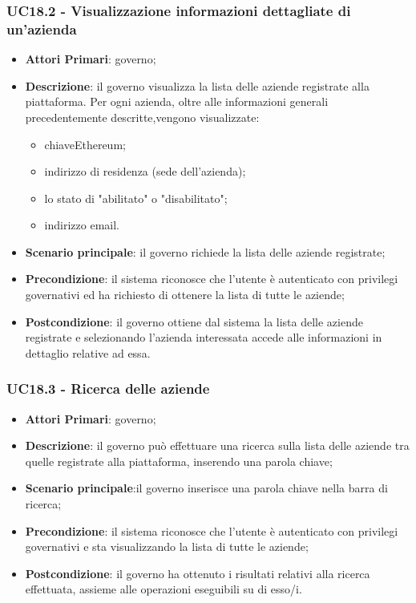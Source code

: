 \subsubsection{UC18.2 - Visualizzazione informazioni dettagliate di un'azienda}

\begin{itemize}
	\item \textbf{Attori Primari}: governo;
	\item \textbf{Descrizione}: il governo visualizza la lista delle aziende registrate alla piattaforma. Per ogni azienda, oltre alle informazioni generali precedentemente descritte,vengono visualizzate:
	\begin{itemize}
		\item chiave\glosp Ethereum\glo;
		\item indirizzo di residenza (sede dell'azienda);
		\item lo stato di "abilitato" o "disabilitato";
		\item indirizzo email.
	\end{itemize}
	
	\item \textbf{Scenario principale}: il governo richiede la lista delle aziende registrate;
	\item \textbf{Precondizione}: il sistema riconosce che l'utente è autenticato con privilegi governativi ed ha richiesto di ottenere la lista di tutte le aziende;
	\item \textbf{Postcondizione}: il governo ottiene dal sistema la lista delle aziende registrate e selezionando l'azienda interessata accede alle informazioni in dettaglio relative ad essa.
\end{itemize}

\subsubsection{UC18.3 - Ricerca delle aziende}
\begin{itemize}
	\item \textbf{Attori Primari}: governo;
	\item \textbf{Descrizione}:
	il governo può effettuare una ricerca sulla lista delle aziende tra quelle registrate alla piattaforma, inserendo una parola chiave;
	\item \textbf{Scenario principale}:il governo inserisce una parola chiave nella barra di ricerca;
	\item \textbf{Precondizione}: il sistema riconosce che l'utente è autenticato con privilegi governativi e sta visualizzando la lista di tutte le aziende;
	\item \textbf{Postcondizione}:
	il governo ha ottenuto i risultati relativi alla ricerca effettuata, assieme alle operazioni eseguibili su di esso/i.
\end{itemize}


